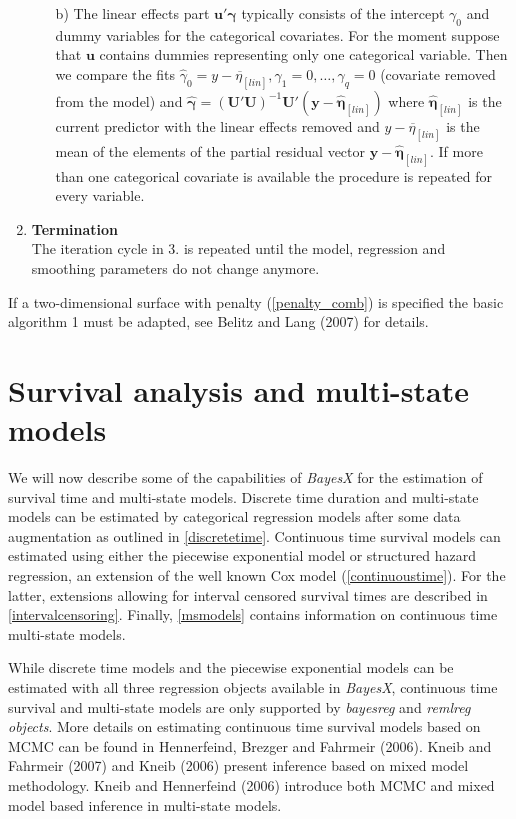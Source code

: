 \documentclass[11pt,a4paper,twoside]{bayesxarticle}
\def \etavec {\boldsymbol{\eta}}
\def \gammavec {\boldsymbol{\gamma}}
\def \yvec {\mathbf{y}}
\def \uvec {\mathbf{u}}
\def \Uvec {\mathbf{U}}
\begin{document}
\begin{enumerate}
\begin{itemize}
\item[b)] The linear effects part $\uvec'\gammavec$  typically consists of the intercept $\gamma_0$ and
dummy variables for the categorical covariates. For the moment suppose that $\uvec$ contains
dummies representing only one categorical variable. Then we compare the fits
$\hat{\gamma}_0 = \overline{y-\eta_{[lin]}}, \gamma_1=0,\dots,\gamma_q=0$ (covariate removed from the model) and
$\hat{\gammavec} = (\Uvec'\Uvec)^{-1} \Uvec' (\yvec - \hat{\etavec}_{[lin]})$ where
$\hat{\etavec}_{[lin]}$ is the current predictor with the linear effects removed and
$\overline{y-\eta_{[lin]}}$ is the mean of the elements of the partial residual vector
$\yvec - \hat{\etavec}_{[lin]}$. If more than one categorical covariate is available
the procedure is repeated for every variable.
\end{itemize}
\item {\bf Termination} \\
The iteration cycle in 3. is repeated until the model, regression and smoothing parameters do not change anymore.
\end{enumerate}
If a two-dimensional surface with penalty (\ref{penalty_comb}) is
specified the basic algorithm 1 must be adapted, see Belitz and Lang
(2007) for details.


\section{Survival analysis and multi-state models}
\label{survivalAnalysis}

We will now describe some of the capabilities of {\em BayesX} for
the estimation of survival time and multi-state models. Discrete
time duration and multi-state models can be estimated by categorical
regression models after some data augmentation as outlined in
\autoref{discretetime}. Continuous time survival models can
estimated using either the piecewise exponential model or structured
hazard regression, an extension of the well known Cox model
(\autoref{continuoustime}). For the latter, extensions allowing for
interval censored survival times are described in
\autoref{intervalcensoring}. Finally, \autoref{msmodels} contains
information on continuous time multi-state models.

While discrete time models and the piecewise exponential models can
be estimated with all three regression objects available in {\em
BayesX}, continuous time survival and multi-state models are only
supported by {\em bayesreg} and {\em remlreg objects}. More details
on estimating continuous time survival models based on MCMC can be
found in Hennerfeind, Brezger and Fahrmeir (2006). Kneib and
Fahrmeir (2007) and Kneib (2006) present inference based on mixed
model methodology. Kneib and Hennerfeind (2006) introduce both MCMC
and mixed model based inference in multi-state models.
\end{document}
